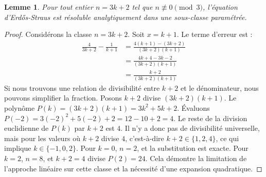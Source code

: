 \documentclass[11pt,a4paper]{article}
\newtheorem{lemma}{Lemme}
\begin{document}
\begin{lemma}
Pour tout entier $n = 3k + 2$ tel que $n \not\equiv 0 \pmod 3$, l'équation d'Erd\H{{o}}s-Straus est résoluble analytiquement dans une sous-classe paramétrée.
\end{lemma}

\begin{proof}
Considérons la classe $n = 3k + 2$.
Soit $x = k + 1$. Le terme d'erreur est :
\begin{align*}
\frac{4}{3k+2} - \frac{1}{k+1} &= \frac{4(k+1) - (3k+2)}{(3k+2)(k+1)} \\
&= \frac{4k + 4 - 3k - 2}{(3k+2)(k+1)} \\
&= \frac{k+2}{(3k+2)(k+1)}
\end{align*}
Si nous trouvons une relation de divisibilité entre $k+2$ et le dénominateur, nous pouvons simplifier la fraction.
Posons $k+2$ divise $(3k+2)(k+1)$.
Le polynôme $P(k) = (3k+2)(k+1) = 3k^2 + 5k + 2$.
Évaluons $P(-2) = 3(-2)^2 + 5(-2) + 2 = 12 - 10 + 2 = 4$.
Le reste de la division euclidienne de $P(k)$ par $k+2$ est $4$.
Il n'y a donc pas de divisibilité universelle, mais pour les valeurs où $k+2$ divise $4$, c'est-à-dire $k+2 \in \{1, 2, 4\}$, ce qui implique $k \in \{-1, 0, 2\}$.
Pour $k = 0$, $n = 2$, et la substitution est exacte. Pour $k = 2$, $n = 8$, et $k+2=4$ divise $P(2) = 24$.
Cela démontre la limitation de l'approche linéaire sur cette classe et la nécessité d'une expansion quadratique.
\end{proof}
\end{document}
